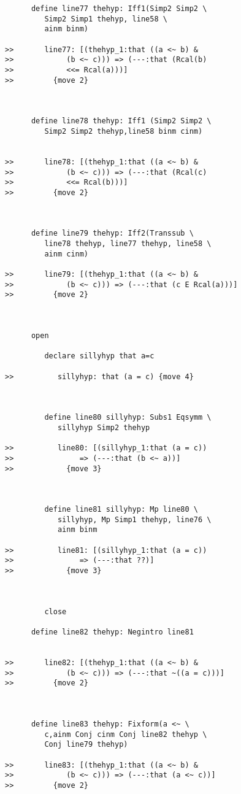 \documentclass[12pt]{article}
\begin{document}
\begin{verbatim}
      define line77 thehyp: Iff1(Simp2 Simp2 \
         Simp2 Simp1 thehyp, line58 \
         ainm binm)

>>       line77: [(thehyp_1:that ((a <~ b) &
>>            (b <~ c))) => (---:that (Rcal(b)
>>            <<= Rcal(a)))]
>>         {move 2}



      define line78 thehyp: Iff1 (Simp2 Simp2 \
         Simp2 Simp2 thehyp,line58 binm cinm)


>>       line78: [(thehyp_1:that ((a <~ b) &
>>            (b <~ c))) => (---:that (Rcal(c)
>>            <<= Rcal(b)))]
>>         {move 2}



      define line79 thehyp: Iff2(Transsub \
         line78 thehyp, line77 thehyp, line58 \
         ainm cinm)

>>       line79: [(thehyp_1:that ((a <~ b) &
>>            (b <~ c))) => (---:that (c E Rcal(a)))]
>>         {move 2}



      open

         declare sillyhyp that a=c

>>          sillyhyp: that (a = c) {move 4}



         define line80 sillyhyp: Subs1 Eqsymm \
            sillyhyp Simp2 thehyp

>>          line80: [(sillyhyp_1:that (a = c))
>>               => (---:that (b <~ a))]
>>            {move 3}



         define line81 sillyhyp: Mp line80 \
            sillyhyp, Mp Simp1 thehyp, line76 \
            ainm binm

>>          line81: [(sillyhyp_1:that (a = c))
>>               => (---:that ??)]
>>            {move 3}



         close

      define line82 thehyp: Negintro line81


>>       line82: [(thehyp_1:that ((a <~ b) &
>>            (b <~ c))) => (---:that ~((a = c)))]
>>         {move 2}



      define line83 thehyp: Fixform(a <~ \
         c,ainm Conj cinm Conj line82 thehyp \
         Conj line79 thehyp)

>>       line83: [(thehyp_1:that ((a <~ b) &
>>            (b <~ c))) => (---:that (a <~ c))]
>>         {move 2}




\end{verbatim}
\end{document}
